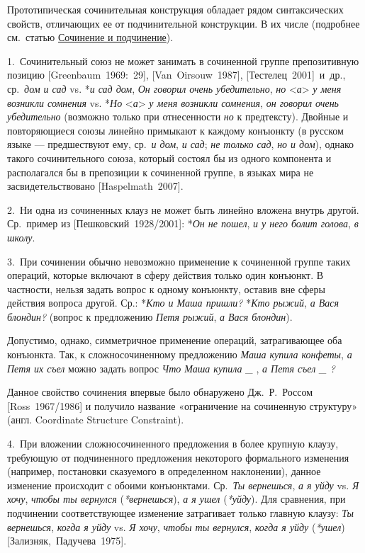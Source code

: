 Прототипическая сочинительная конструкция обладает рядом синтаксических
свойств, отличающих ее от подчинительной конструкции. В их числе
(подробнее см.~статью \underline{Сочинение и подчинение}).

1.~Сочинительный союз не может занимать в сочиненной группе
препозитивную позицию {[}Greenbaum~1969:~29{]}, {[}Van~Oirsouw~1987{]},
{[}Тестелец~2001{]}~и~др., ср.~\textit{дом и сад} vs. *\textit{и сад дом},
\textit{Он говорил очень убедительно}, \textit{но}
\textless{}\textit{а}\textgreater{} \textit{у меня возникли сомнения} vs.
*\textit{Но} \textless{}\textit{а}\textgreater{} \textit{у меня возникли
сомнения}, \textit{он говорил очень убедительно} (возможно только при
отнесенности \textit{но} к предтексту). Двойные и повторяющиеся союзы
линейно примыкают к каждому конъюнкту (в русском языке --- предшествуют
ему, ср.~\textit{и дом}, \textit{и сад}; \textit{не только сад}, \textit{но и
дом}), однако такого сочинительного союза, который состоял бы из одного
компонента и располагался бы в препозиции к сочиненной группе, в языках
мира не засвидетельствовано {[}Haspelmath~2007{]}.

2.~Ни одна из сочиненных клауз не может быть линейно вложена внутрь
другой. Ср.~пример из {[}Пешковский~1928/2001{]}: *\textit{Он не пошел},
\textit{и у него болит голова}, \textit{в школу}.

3.~При сочинении обычно невозможно применение к сочиненной группе таких
операций, которые включают в сферу действия только один конъюнкт. В
частности, нельзя задать вопрос к одному конъюнкту, оставив вне сферы
действия вопроса другой. Ср.: *\textit{Кто и Маша пришли?} *\textit{Кто
рыжий}, \textit{а Вася блондин?} (вопрос к предложению \textit{Петя рыжий},
\textit{а Вася блондин}).

Допустимо, однако, симметричное применение операций, затрагивающее оба
конъюнкта. Так, к сложносочиненному предложению \textit{Маша купила
конфеты}, \textit{а Петя их съел} можно задать вопрос \textit{Что Маша
купила \_} , \textit{а Петя съел \_ ?}

Данное свойство сочинения впервые было обнаружено Дж.~Р.~Россом
{[}Ross~1967/1986{]} и получило название «ограничение на сочиненную
структуру» (англ. Coordinate Structure Constraint).

4.~При вложении сложносочиненного предложения в более крупную клаузу,
требующую от подчиненного предложения некоторого формального изменения
(например, постановки сказуемого в определенном наклонении), данное
изменение происходит с обоими конъюнктами. Ср.~\textit{Ты вернешься},
\textit{а я уйду} vs. \textit{Я хочу}, \textit{чтобы ты вернулся}
(\textit{*вернешься}), \textit{а я ушел} (\textit{*уйду}). Для сравнения, при
подчинении соответствующее изменение затрагивает только главную клаузу:
\textit{Ты вернешься}, \textit{когда я уйду} vs. \textit{Я хочу}, \textit{чтобы
ты вернулся}, \textit{когда я уйду} (\textit{*ушел})
{[}Зализняк,~Падучева~1975{]}.

